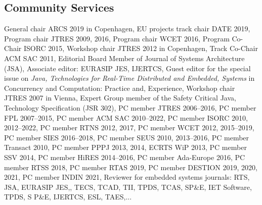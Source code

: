 \documentclass[%
    a4paper,
    11pt, %
    headinclude, footexclude,
    notitlepage,
    headsepline,
    pointlessnumbers,
    ]{scrartcl}
\begin{document}
\subsection*{Community Services}

   General chair ARCS 2019 in Copenhagen,
   EU projects track chair DATE 2019,
   Program chair JTRES 2009, 2016,
   Program chair WCET 2016,
   Program Co-Chair ISORC 2015,
   Workshop chair JTRES 2012 in Copenhagen,
   Track Co-Chair ACM SAC 2011,
   Editorial Board Member of Journal of Systems Architecture (JSA),
   Associate editor: EURASIP JES, IJERTCS,
   Guest editor for the special issue on \emph{Java,
      Technologies for Real-Time Distributed and Embedded,
      Systems} in Concurrency and Computation: Practice and,
      Experience,
   Workshop chair JTRES 2007 in Vienna,
   Expert Group member of the Safety Critical Java,
      Technology Specification (JSR 302),
   PC member JTRES 2006--2016,
   PC member FPL 2007--2015,
   PC member ACM SAC 2010--2022,
   PC member ISORC 2010, 2012--2022,
   PC member RTNS 2012, 2017,
   PC member WCET 2012, 2015--2019,
   PC member SIES 2016--2018,
   PC member SEUS 2010, 2013--2016,
   PC member Transact 2010,
   PC member PPPJ 2013, 2014, ECRTS WiP 2013,
   PC member SSV 2014,
   PC member HiRES 2014--2016,
   PC member Ada-Europe 2016,
   PC member RTSS 2018,
   PC member RTAS 2019,
   PC member DESTION 2019, 2020, 2021,
   PC member INDIN 2021,
   Reviewer for embedded systems journals: RTS, JSA, EURASIP JES,,
      TECS, TCAD, TII, TPDS, TCAS, SP\&E, IET Software, TPDS, S P\&E, IJERTCS, ESL, TAES,...
\end{document}
